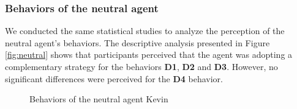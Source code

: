 \documentclass[10pt, a4paper, twocolumn]{article} %
\begin{document}
		\subsubsection{Behaviors of the neutral agent}
		
		We conducted the same statistical studies to analyze the perception of the neutral agent's behaviors. The descriptive analysis presented in Figure \ref{fig:neutral} shows that participants perceived that the agent was adopting a complementary strategy for the behaviors \textbf{D1}, \textbf{D2} and \textbf{D3}. However, no significant differences were perceived for the \textbf{D4} behavior.
		
			\begin{figure}[!tb]
				\centering
				
				\caption{Behaviors of the neutral agent Kevin}
				\label{fig:neutre}
			\end{figure}
		
\end{document}
